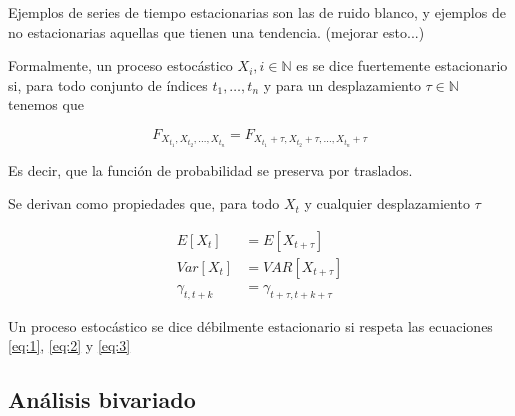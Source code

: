 Ejemplos de series de tiempo estacionarias son las de ruido blanco, y ejemplos de no estacionarias aquellas que tienen una tendencia. (mejorar esto...)

Formalmente, un proceso estocástico $X_i, i \in \mathbb{N}$ es se dice fuertemente estacionario si, para todo conjunto de índices $t_1, \ldots , t_n$ y para un desplazamiento $\tau \in \mathbb{N}$ tenemos que

\begin{displaymath}
    F_{X_{t_1}, X_{t_2}, \ldots , X_{t_n} } = F_{X_{t_1} + \tau, X_{t_2} + \tau, \ldots , X_{t_n} + \tau}
\end{displaymath}

Es decir, que la función de probabilidad se preserva por traslados.

Se derivan como propiedades que, para todo $X_t$ y cualquier desplazamiento $\tau$

\begin{align}
    E[X_t] &= E[X_{t + \tau}] \label{eq:1} \\
    Var[X_t] &= VAR[X_{t + \tau}] \label{eq:2} \\
    \gamma_{t, t+k} &= \gamma_{t+\tau, t + k + \tau } \label{eq:3}
\end{align}

Un proceso estocástico se dice débilmente estacionario si respeta las ecuaciones \ref{eq:1}, \ref{eq:2} y \ref{eq:3}
\subsection{Análisis bivariado}

